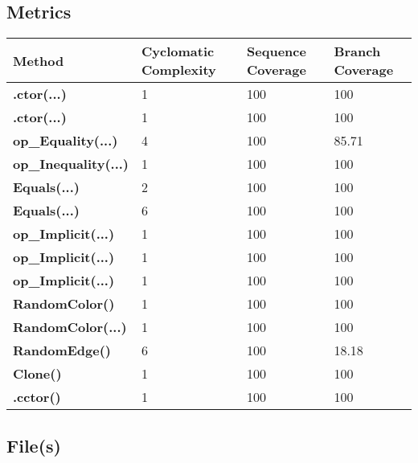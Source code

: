 \documentclass[a4paper,10pt]{article}
\begin{document}
\subsection{Metrics}
\begin{longtable}[l]{|l|l|l|l|}
\hline
\textbf{Method} & \textbf{Cyclomatic Complexity} & \textbf{Sequence Coverage} & \textbf{Branch Coverage}\\
\hline
\textbf{.ctor(...)} & 1 & 100 & 100\\
\hline
\textbf{.ctor(...)} & 1 & 100 & 100\\
\hline
\textbf{op\_Equality(...)} & 4 & 100 & 85.71\\
\hline
\textbf{op\_Inequality(...)} & 1 & 100 & 100\\
\hline
\textbf{Equals(...)} & 2 & 100 & 100\\
\hline
\textbf{Equals(...)} & 6 & 100 & 100\\
\hline
\textbf{op\_Implicit(...)} & 1 & 100 & 100\\
\hline
\textbf{op\_Implicit(...)} & 1 & 100 & 100\\
\hline
\textbf{op\_Implicit(...)} & 1 & 100 & 100\\
\hline
\textbf{RandomColor()} & 1 & 100 & 100\\
\hline
\textbf{RandomColor(...)} & 1 & 100 & 100\\
\hline
\textbf{RandomEdge()} & 6 & 100 & 18.18\\
\hline
\textbf{Clone()} & 1 & 100 & 100\\
\hline
\textbf{.cctor()} & 1 & 100 & 100\\
\hline
\end{longtable}
\subsection{File(s)}
\end{document}
